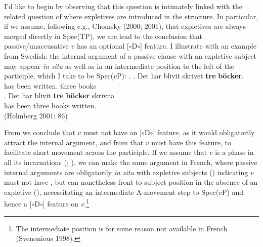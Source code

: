 \documentclass[11pt, letterpaper]{paper_nick}
\newcommand{\fm}[1]{[$\circ$#1$\circ$]}
\begin{document}
I'd like to begin by observing that this question is intimately linked with the related question of where expletives are introduced in the structure. In particular, if we assume, following e.g., Chomsky (2000; 2001), that expletives are always merged directly in Spec(TP), we are lead to the conclusion that passive/unaccusative $v$ has an optional \fm{D} feature. I illustrate with an example from Swedish: the internal argument of a passive clause with an expletive subject may appear \emph{in situ}  as well as in an intermediate position to the left of the participle, which I take to be Spec($v$P):
\ex. \ag. Det har blivit skrivet \textbf{tre} \textbf{b\"ocker}.\\
 has been written. three books\\
\bg. Det har blivit \textbf{tre} \textbf{b\"ocker} skrivna\\ 
 has been three books written.\\
(Holmberg 2001: 86)

From \LLast we conclude that $v$ must not have an \fm{D} feature, as it would obligatorily attract the internal argument, and from \Last that $v$ must have this feature, to facilitate short movement across the participle. If we assume that $v$ is a phase in all its incarnations (\citealt{sauerland03}; \citealt{legate03}), we can make the same argument in French, where passive internal arguments are obligatorily \emph{in situ} with expletive subjects (\Next[a]) indicating $v$ must not have , but can nonetheless front to subject position in the absence of an expletive (\Next[b]), necessitating an intermediate A-movement step to Spec($v$P) and hence a \fm{D} feature on $v$.\footnote{The intermediate position is for some reason not available in French (Svenonious 1998).}
\end{document}
